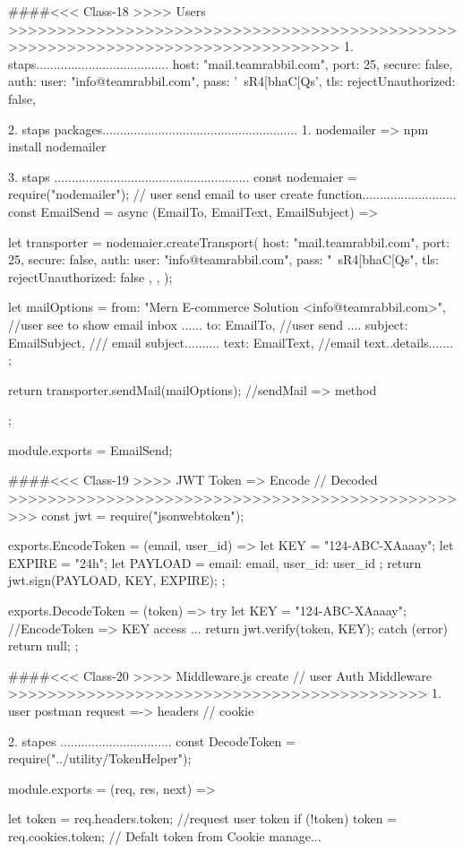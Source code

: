 {{####<<< Class-18 >>>> Users  >>>>>>>>>>>>>>>>>>>>>>>>>>>>>>>>>>>>>>>>>>>>>>>>>>>>>>>>>>>>>>>>>>>>>>>>>>>>>>>>
1. staps......................................
host: "mail.teamrabbil.com",
port: 25,
secure: false,
auth: {user: "info@teamrabbil.com", pass: '~sR4[bhaC[Qs'},
tls: {rejectUnauthorized: false},



2. staps packages........................................................
   1. nodemailer =>  npm install nodemailer 

3. staps ........................................................
const nodemaier = require("nodemailer");
// user send email to user create function...........................
const EmailSend = async (EmailTo, EmailText, EmailSubject) => {
  let transporter = nodemaier.createTransport({
    host: "mail.teamrabbil.com",
    port: 25,
    secure: false,
    auth: {
      user: "info@teamrabbil.com",
      pass: "~sR4[bhaC[Qs",
      tls: { rejectUnauthorized: false },
    },
  });

  let mailOptions = {
    from: "Mern E-commerce Solution <info@teamrabbil.com>", //user see to show email inbox ......
    to: EmailTo, //user send ....
    subject: EmailSubject, /// email subject..........
    text: EmailText, //email text..details.......
  };

  return transporter.sendMail(mailOptions); //sendMail => method
};

module.exports = EmailSend;

####<<< Class-19 >>>> JWT Token => Encode // Decoded  >>>>>>>>>>>>>>>>>>>>>>>>>>>>>>>>>>>>>>>>>>>>>>>>>
const jwt = require("jsonwebtoken");

exports.EncodeToken = (email, user_id) => {
  let KEY = "124-ABC-XAaaay";
  let EXPIRE = "24h";
  let PAYLOAD = { email: email, user_id: user_id };
  return jwt.sign(PAYLOAD, KEY, EXPIRE);
};

exports.DecodeToken = (token) => {
  try {
    let KEY = "124-ABC-XAaaay"; //EncodeToken => KEY access ...
    return jwt.verify(token, KEY);
  } catch (error) {
    return null;
  }
};

####<<< Class-20 >>>> Middleware.js create // user Auth Middleware >>>>>>>>>>>>>>>>>>>>>>>>>>>>>>>>>>>>>>>>>>>
  1. user postman request =-> headers // cookie 
  
  2. stapes ................................
  const { DecodeToken } = require("../utility/TokenHelper");

  module.exports = (req, res, next) => {
    let token = req.headers.token; //request user token 
    if (!token) {
      token = req.cookies.token; // Defalt token from Cookie manage...
    }
  
}}}
